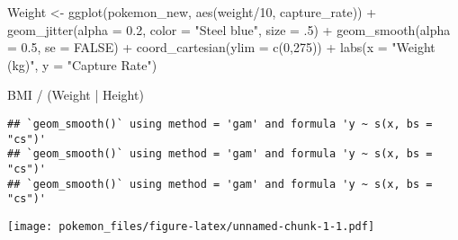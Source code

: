 \documentclass[
]{article}
\newenvironment{Shaded}{\begin{snugshade}}{\end{snugshade}}
\newcommand{\AttributeTok}[1]{\textcolor[rgb]{0.77,0.63,0.00}{#1}}
\newcommand{\ConstantTok}[1]{\textcolor[rgb]{0.00,0.00,0.00}{#1}}
\newcommand{\DecValTok}[1]{\textcolor[rgb]{0.00,0.00,0.81}{#1}}
\newcommand{\FloatTok}[1]{\textcolor[rgb]{0.00,0.00,0.81}{#1}}
\newcommand{\FunctionTok}[1]{\textcolor[rgb]{0.00,0.00,0.00}{#1}}
\newcommand{\NormalTok}[1]{#1}
\newcommand{\OtherTok}[1]{\textcolor[rgb]{0.56,0.35,0.01}{#1}}
\newcommand{\SpecialCharTok}[1]{\textcolor[rgb]{0.00,0.00,0.00}{#1}}
\newcommand{\StringTok}[1]{\textcolor[rgb]{0.31,0.60,0.02}{#1}}
\begin{document}
\begin{Shaded}
\begin{Highlighting}[]
\NormalTok{Weight }\OtherTok{\textless{}{-}} \FunctionTok{ggplot}\NormalTok{(pokemon\_new, }\FunctionTok{aes}\NormalTok{(weight}\SpecialCharTok{/}\DecValTok{10}\NormalTok{, capture\_rate)) }\SpecialCharTok{+} 
  \FunctionTok{geom\_jitter}\NormalTok{(}\AttributeTok{alpha =} \FloatTok{0.2}\NormalTok{, }\AttributeTok{color =} \StringTok{"Steel blue"}\NormalTok{, }\AttributeTok{size =}\NormalTok{ .}\DecValTok{5}\NormalTok{) }\SpecialCharTok{+}
  \FunctionTok{geom\_smooth}\NormalTok{(}\AttributeTok{alpha =} \FloatTok{0.5}\NormalTok{, }\AttributeTok{se =} \ConstantTok{FALSE}\NormalTok{) }\SpecialCharTok{+}
  \FunctionTok{coord\_cartesian}\NormalTok{(}\AttributeTok{ylim =} \FunctionTok{c}\NormalTok{(}\DecValTok{0}\NormalTok{,}\DecValTok{275}\NormalTok{)) }\SpecialCharTok{+}
  \FunctionTok{labs}\NormalTok{(}\AttributeTok{x =} \StringTok{"Weight (kg)"}\NormalTok{, }\AttributeTok{y =} \StringTok{"Capture Rate"}\NormalTok{)}


\NormalTok{BMI }\SpecialCharTok{/}\NormalTok{ (Weight }\SpecialCharTok{|}\NormalTok{ Height)}
\end{Highlighting}
\end{Shaded}

\begin{verbatim}
## `geom_smooth()` using method = 'gam' and formula 'y ~ s(x, bs = "cs")'
## `geom_smooth()` using method = 'gam' and formula 'y ~ s(x, bs = "cs")'
## `geom_smooth()` using method = 'gam' and formula 'y ~ s(x, bs = "cs")'
\end{verbatim}

\texttt{[image: pokemon\_files/figure-latex/unnamed-chunk-1-1.pdf]}
\end{document}
